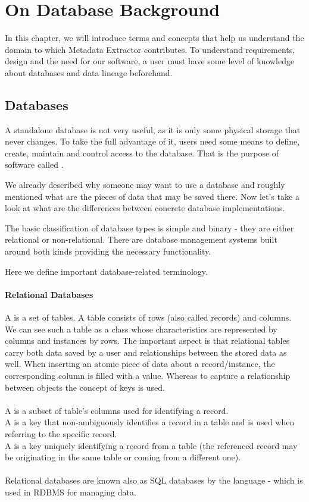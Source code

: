 \chapter{On Database Background}
\label{on_database_background}

In this chapter, we will introduce terms and concepts that help us understand the domain to which Metadata Extractor contributes. To understand requirements, design and the need for our software, a user must have some level of knowledge about databases and data lineage beforehand.

\section{Databases}

A standalone database is not very useful, as it is only some physical storage that never changes. To take the full advantage of it, users need some means to define, create, maintain and control access to the database. That is the purpose of software called .

We already described why someone may want to use a database and roughly mentioned what are the pieces of data that may be saved there. 
Now let's take a look at what are the differences between concrete database implementations.

The basic classification of database types is simple and binary - they are either relational or non-relational. There are database management systems built around both kinds providing the necessary functionality.

Here we define important database-related terminology.

\subsubsection{Relational Databases}
\label{relational_databases}
A  is a set of tables. A table consists of rows (also called records) and columns. We can see such a table as a class whose characteristics are represented by columns and instances by rows.
The important aspect is that relational tables carry both data saved by a user and relationships between the stored data as well. 
When inserting an atomic piece of data about a record/instance, the corresponding column is filled with a value.
Whereas to capture a relationship between objects the concept of keys is used. \\ \\
A  is a subset of table's columns used for identifying a record. \\
A  is a key that non-ambiguously identifies a record in a table and is used when referring to the specific record. \\
A  is a key uniquely identifying a record from a table (the referenced record may be originating in the same table or coming from a different one). \\ \\
Relational databases are known also as SQL databases by the language -  which is used in RDBMS for managing data.

